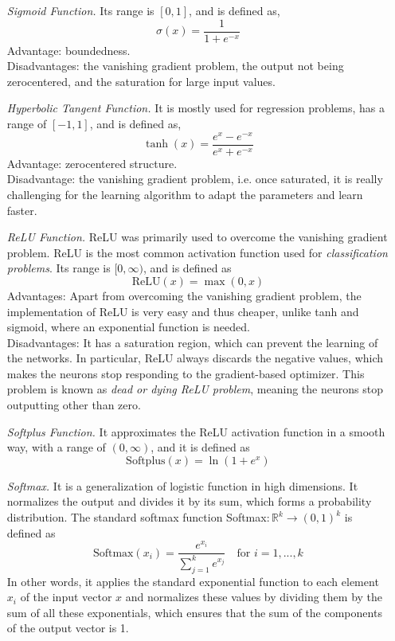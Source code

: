\documentclass[nobib]{tufte-handout} %
\begin{document}
\begin{enumerate}
  \item[\it Sigmoid Function.] Its range is $[0,1]$, and is defined as,
$$\sigma(x) = \frac{1}{1 + e^{-x}}$$
Advantage: boundedness. \\ Disadvantages:
the vanishing gradient problem, the output not being zerocentered, and the saturation for large input values. 
  \item[\it Hyperbolic Tangent Function.] It is mostly used for
regression problems, has a range of $[-1,1]$, and is defined as,
$$\tanh(x) = \frac{e^{x} - e^{-x}}{e^{x} + e^{-x}}$$
Advantage: zerocentered structure. \\
Disadvantage: the vanishing gradient problem, i.e. once saturated, it is really challenging
for the learning algorithm to adapt the parameters and learn
faster.
  \item[\it ReLU Function.] ReLU was primarily used to overcome the vanishing gradient problem. ReLU is the most common activation function used for \textit{classification problems}. Its range is $[0, \infty)$, and is defined as
  $$\text{ReLU}(x) = \max(0, x)$$
Advantages: Apart from overcoming the vanishing gradient problem, the
implementation of ReLU is very easy and thus cheaper, unlike
tanh and sigmoid, where an exponential function is needed.
\\
Disadvantages: It has a saturation region, which can prevent the
learning of the networks. In particular, ReLU always discards
the negative values, which makes the neurons stop responding to
the gradient-based optimizer. This problem is known as \textit{dead
or dying ReLU problem}, meaning the neurons stop
outputting other than zero. 
\item[\it Softplus Function.] It approximates the ReLU activation function in a smooth way, with a range of $(0, \infty)$, and it is defined as
$$\text{Softplus}(x) = \ln (1+ e^x) $$
\item[\it Softmax.] It is a generalization of logistic
function in high dimensions. It normalizes the output and
divides it by its sum, which forms a probability distribution. The standard softmax function Softmax$: \mathbb{R}^k \to (0,1)^k$ is defined as 
$$\text{Softmax}(x_i) = \frac{e^{x_i}}{\sum^{k}_{j=1} e^{x_j}} \quad \text{for } i= 1,...,k   $$
In other words, it applies
the standard exponential function to each element $x_i$
of the input vector $x$ and normalizes these values by
dividing them by the sum of all these exponentials, which ensures that the sum of the components of the output vector is 1.

\end{enumerate}
\end{document}
